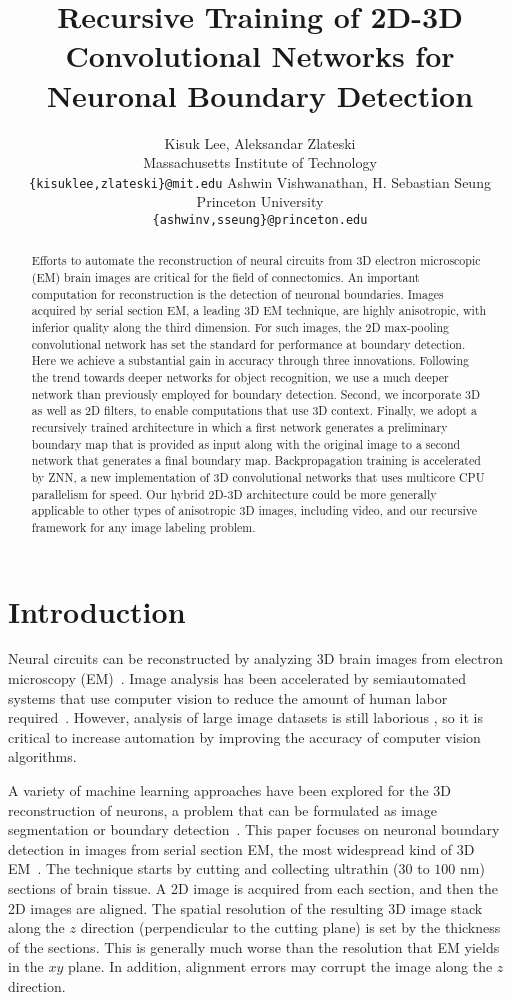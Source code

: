 \documentclass{article} %
\title{Recursive Training of 2D-3D Convolutional Networks for Neuronal Boundary Detection}
\author{
Kisuk Lee, Aleksandar Zlateski\\
Massachusetts Institute of Technology \\
\texttt{\{kisuklee,zlateski\}@mit.edu}
\And
Ashwin Vishwanathan, H. Sebastian Seung \\
Princeton University \\
\texttt{\{ashwinv,sseung\}@princeton.edu}
}
\begin{document}
\maketitle

\begin{abstract}
Efforts to automate the reconstruction of neural circuits from 3D
electron microscopic (EM) brain images are critical for the field of
connectomics. An important computation for reconstruction is the
detection of neuronal boundaries. Images acquired by serial section
EM, a leading 3D EM technique, are highly anisotropic, with inferior
quality along the third dimension. For such images, the 2D
max-pooling convolutional network has set the standard for performance
at boundary detection. Here we achieve a substantial gain in accuracy
through three innovations. Following the trend towards deeper
networks for object recognition, we use a much deeper network than
previously employed for boundary detection. Second, we incorporate 3D
as well as 2D filters, to enable computations that use 3D context.
Finally, we adopt a recursively trained architecture in which a first network
generates a preliminary boundary map that is provided as input along
with the original image to a second network that generates a final
boundary map. Backpropagation training is accelerated by ZNN, a new
implementation of 3D convolutional networks that uses multicore CPU
parallelism for speed. Our hybrid 2D-3D architecture could be more
generally applicable to other types of anisotropic 3D images,
including video, and our recursive framework for any image labeling
problem.
\end{abstract}



\section{Introduction}

Neural circuits can be reconstructed by analyzing 3D brain images from
electron microscopy (EM)~\cite{White1986}. Image analysis has been accelerated
by semiautomated systems that use computer vision to reduce the amount
of human labor required~\cite{Takemura2013,
  Helmstaedter2013,Kim2014}. However, analysis of large image datasets
is still laborious \cite{Helmstaedter2014}, so it is critical to increase
automation by improving the accuracy of computer vision algorithms.

A variety of machine learning approaches have been explored for the 3D
reconstruction of neurons, a problem that can be formulated as image
segmentation or boundary detection~\cite{Jain2010,Tasdizen2014}.  This
paper focuses on neuronal boundary detection in images from serial
section EM, the most widespread kind of 3D EM~\cite{Briggman2012}. The technique starts by cutting and collecting ultrathin ($30$ to
$100$ nm) sections of brain tissue.  A 2D image is acquired from each
section, and then the 2D images are aligned.  The spatial resolution
of the resulting 3D image stack along the $z$ direction (perpendicular
to the cutting plane) is set by the thickness of the sections. This is
generally much worse than the resolution that EM yields in the $xy$
plane.  In addition, alignment errors may corrupt the image along the
$z$ direction.
\end{document}

